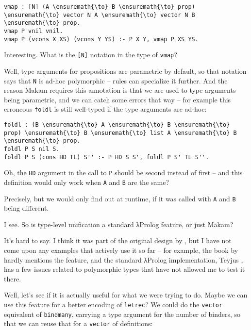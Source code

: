 \begin{verbatim}
vmap : [N] (A \ensuremath{\to} B \ensuremath{\to} prop) \ensuremath{\to} vector N A \ensuremath{\to} vector N B \ensuremath{\to} prop.
vmap P vnil vnil.
vmap P (vcons X XS) (vcons Y YS) :- P X Y, vmap P XS YS.
\end{verbatim}

\heroSTUDENT{} Interesting. What is the \texttt{{[}N{]}} notation in the type
of \texttt{vmap}?

\heroADVISOR{} Well, type arguments for propositions are parametric by
default, so that notation says that \texttt{N} is ad-hoc polymorphic --
rules can specialize it further. And the reason Makam requires this
annotation is that we are used to type arguments being parametric, and
we can catch some errors that way -- for example this erroneous
\texttt{foldl} is still well-typed if the type arguments are ad-hoc:

\begin{verbatim}
foldl : (B \ensuremath{\to} A \ensuremath{\to} B \ensuremath{\to} prop) \ensuremath{\to} B \ensuremath{\to} list A \ensuremath{\to} B \ensuremath{\to} prop.
foldl P S nil S.
foldl P S (cons HD TL) S'' :- P HD S S', foldl P S' TL S''.
\end{verbatim}

\heroSTUDENT{} Oh, the \texttt{HD} argument in the call to \texttt{P} should
be second instead of first -- and this definition would only work when
\texttt{A} and \texttt{B} are the same?

\heroADVISOR{} Precisely, but we would only find out at runtime, if it was
called with \texttt{A} and \texttt{B} being different.

\heroSTUDENT{} I see. So is type-level unification a standard \foreignlanguage{greek}{λ}Prolog feature,
or just Makam?

\heroADVISOR{} It's hard to say. I think it was part of the original design by
\citet{miller1988overview}, but I have not come upon any examples that
actively use it so far -- for example, the book by
\citet{miller2012programming} hardly mentions the feature, and the
standard \foreignlanguage{greek}{λ}Prolog implementation, Teyjus \citep{nadathur1999system}, has
a few issues related to polymorphic types that have not allowed me to
test it there.

\heroSTUDENT{} Well, let's see if it is actually useful for what we were
trying to do. Maybe we can use this feature for a better encoding of
\texttt{letrec}? We could do the \texttt{vector} equivalent of
\texttt{bindmany}, carrying a type argument for the number of binders,
so that we can reuse that for a \texttt{vector} of definitions:

